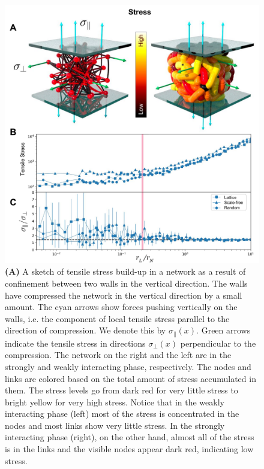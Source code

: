 \documentclass[nofootinbib,preprint,floatfix,titlepage,endfloats,superscriptaddress]{revtex4} %
\begin{document}
\begin{figure}
    \vspace{5cm}
    \includegraphics[width=.9\columnwidth]{fig-09-19/3D-stress-101217.pdf}
    \caption{\scriptsize
    {\bf (A)} A sketch of tensile stress build-up in a network as a result of confinement between two walls in the vertical direction. 
    The walls have compressed the network in the vertical direction by a small amount.
    The cyan arrows show forces pushing vertically on the walls, i.e. the component of local tensile stress parallel to the direction of compression. 
    We denote this by $\sigma_\parallel(x)$. 
    Green arrows indicate the tensile stress in directions $\sigma_\perp(x)$
    perpendicular to the compression. 
    The network on the right and the left are in the strongly and weakly interacting phase, respectively. 
    The nodes and links are colored based on the total amount of stress accumulated in them. 
    The stress levels go from dark red for very little stress to bright yellow for very high stress. 
    Notice that in the weakly interacting phase (left) most of the stress is concentrated in the nodes and most links show very little stress. 
    In the strongly interacting phase (right), on the other hand, almost all of the stress is in the links and the visible nodes appear dark red, indicating low stress.  
}
\end{figure}
\end{document}
